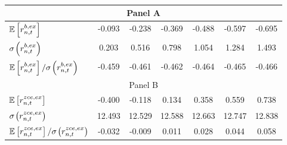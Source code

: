 \begin{table}[h!] \small
\captionsetup{font=small, width=0.8\textwidth}
\caption{} \label{tab:tab1} \vspace{0.25cm}
\centering
\def\arraystretch{1.1}
\begin{tabular}{l|cccccc}
\hline\hline
\multicolumn{7}{c}{Panel A} \\\hline\hline
$\mathbb{E}\left[r_{n,t}^{b,ex}\right]$&-0.093 &-0.238 &-0.369 &-0.488 &-0.597 &-0.695 \\
$\sigma\hspace{-0.02cm}\left(r_{n,t}^{b,ex}\right)$&0.203 &0.516 &0.798 &1.054 &1.284 &1.493 \\
$\E\left[r_{n,t}^{b,ex}\right]/\sigma\hspace{-0.02cm}\left(r_{n,t}^{b,ex}\right)$&-0.459 &-0.461 &-0.462 &-0.464 &-0.465 &-0.466 \\
\hline\hline
\multicolumn{7}{c}{Panel B} \\\hline\hline
$\mathbb{E}\left[r_{n,t}^{zce,ex}\right]$&-0.400 &-0.118 &0.134 &0.358 &0.559 &0.738 \\
$\sigma\hspace{-0.02cm}\left(r_{n,t}^{zce,ex}\right)$&12.493 &12.529 &12.588 &12.663 &12.747 &12.838 \\
$\E\left[r_{n,t}^{zce,ex}\right]/\sigma\hspace{-0.02cm}\left(r_{n,t}^{zce,ex}\right)$&-0.032 &-0.009 &0.011 &0.028 &0.044 &0.058 \\
\hline
\hline
\end{tabular}
\end{table}
